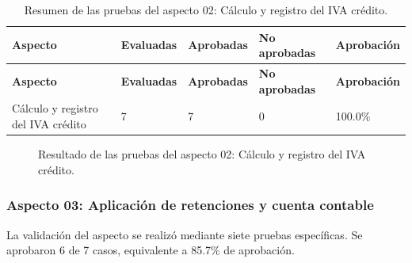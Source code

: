\endgroup
\begingroup\fontsize{8}{9}\selectfont\setlength{\tabcolsep}{4pt}
\begin{xltabular}{\linewidth}{@{}p{4.0cm}p{2.0cm}p{2.0cm}p{2.2cm}p{2.2cm}@{}}

\caption{Resumen de las pruebas del aspecto 02: Cálculo y registro del IVA crédito.}\label{tab:cap4_resumen_aspecto_02}\\
\toprule
\textbf{Aspecto} & \textbf{Evaluadas} & \textbf{Aprobadas} & \textbf{No aprobadas} & \textbf{Aprobación}\\
\midrule
\endfirsthead
\toprule
\textbf{Aspecto} & \textbf{Evaluadas} & \textbf{Aprobadas} & \textbf{No aprobadas} & \textbf{Aprobación}\\
\midrule
\endhead
\endfoot
\bottomrule
\endlastfoot

Cálculo y registro del IVA crédito & 7 & 7 & 0 & 100.0\%\\
\bottomrule
\end{xltabular}
\endgroup


\begin{figure}[H]
\centering
\caption{Resultado de las pruebas del aspecto 02: Cálculo y registro del IVA crédito.}\label{fig:cap4_aspecto_prov_02}
\end{figure}

\subsubsection{Aspecto 03: Aplicación de retenciones y cuenta contable}
La validación del aspecto se realizó mediante siete pruebas específicas. Se aprobaron 6 de 7 casos, equivalente a 85.7\% de aprobación.

